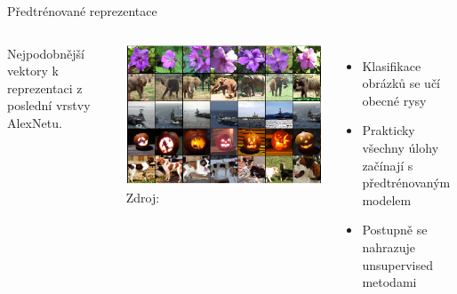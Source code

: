 \documentclass[handout,aspectratio=169,dvipsnames]{beamer}
\begin{document}
\begin{frame}{Předtrénované reprezentace}

    \begin{columns}

        \centering

        Nejpodobnější vektory k reprezentaci z poslední vrstvy AlexNetu.

        \includegraphics[scale=0.25]{./img/alexnet_neighbors.png} \\
        {\tiny Zdroj: \citet[obr.\ 4]{krizhevsky_imagenet_2012}}



    \begin{itemize}[<+->]

        \item Klasifikace obrázků se učí obecné rysy

        \item Prakticky všechny úlohy začínají s předtrénovaným modelem

        \item Postupně se nahrazuje unsupervised metodami

    \end{itemize}


    \end{columns}

\end{frame}

\end{document}
